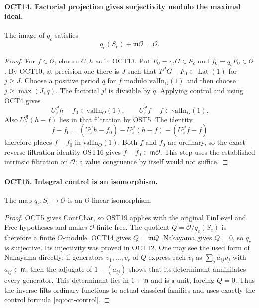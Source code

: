 \documentclass[11pt,a4paper]{article}
\numberwithin{equation}{section}
\theoremstyle{remark}\newtheorem{remark}[theorem]{Remark}
\begin{document}
\paragraph{OCT14. Factorial projection gives surjectivity modulo the maximal ideal.}
\label{claim:OCT14}
The image of $q_c$ satisfies
\[
                         q_c(S_c)+\mathfrak m\mathcal O
                                                   =\mathcal O.
\]
\begin{proof}
For $f\in\mathcal O$, choose $G,\allowbreak{} h$ as in OCT13.  Put
$F_0=e_cG\in S_c$ and $f_0=q_cF_0\in\mathcal O$.
By OCT10, at precision one there is $J$ such that
$T^{j!}G-F_0\in\operatorname{Lat}(1)$ for $j\geq J$.
Choose a positive period $q$ for $f$ modulo
$\mathrm{valIn}_O(1)$ and then choose $j\geq\max(J,\allowbreak{} q)$.
The factorial $j!$ is divisible by $q$.  Applying control
and using OCT4 gives
\[
 U_z^{j!}h-f_0\in\mathrm{valIn}_O(1),\qquad
 U_z^{j!}f-f\in\mathrm{valIn}_O(1).
\]
Also $U_z^{j!}(h-f)$ lies in that filtration by OST5.
The identity
\[
 f-f_0=(U_z^{j!}h-f_0)-U_z^{j!}(h-f)-(U_z^{j!}f-f)
\]
therefore places $f-f_0$ in $\mathrm{valIn}_O(1)$.
Both $f$ and $f_0$ are ordinary, so the exact reverse
filtration identity OST16 gives
$f-f_0\in\mathfrak m\mathcal O$.
This step uses the established intrinsic filtration on
$\mathcal O$; a value congruence by itself would not suffice.
\end{proof}

\paragraph{OCT15. Integral control is an isomorphism.}
\label{claim:OCT15}
The map $q_c:S_c\to\mathcal O$ is an $O$-linear isomorphism.
\begin{proof}
OCT5 gives ContChar, so OST19 applies with the original
FinLevel and Free hypotheses and makes $\mathcal O$ finite
free.  The quotient $Q=\mathcal O/q_c(S_c)$ is therefore a
finite $O$-module.  OCT14 gives $Q=\mathfrak m Q$.
Nakayama gives $Q=0$, so $q_c$ is surjective.  Its injectivity
was proved in OCT12.  One may see the used form of Nakayama
directly: if generators $v_1,\ldots,\allowbreak{} v_r$ of $Q$ express each
$v_i$ as $\sum_j a_{ij}v_j$ with $a_{ij}\in\mathfrak m$,
then the adjugate of $1-(a_{ij})$ shows that its determinant
annihilates every generator.  This determinant lies in
$1+\mathfrak m$ and is a unit, forcing $Q=0$.
Thus the inverse lifts ordinary functions to actual classical
families and uses exactly the control formula
\eqref{eq:oct-control}.
\end{proof}
\end{document}
